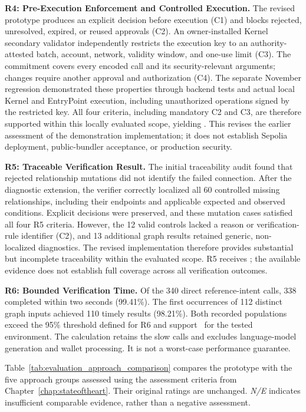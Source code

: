 \noindent\textbf{R4: Pre-Execution Enforcement and Controlled Execution.}
The revised prototype produces an explicit decision before execution (C1)
and blocks rejected, unresolved, expired, or reused approvals (C2).
An owner-installed Kernel secondary validator independently restricts the
execution key to an authority-attested batch, account, network, validity
window, and one-use limit (C3). The commitment covers every encoded call
and its security-relevant arguments; changes require another approval and
authorization (C4). The separate November regression demonstrated these
properties through backend tests and actual local Kernel and EntryPoint
execution, including unauthorized operations signed by the restricted key.
All four criteria, including mandatory C2 and C3, are therefore supported
within this locally evaluated scope, yielding \evThree{}. This revises the
earlier \evOne{} assessment of the demonstration implementation; it does
not establish Sepolia deployment, public-bundler acceptance, or production
security.


\medskip\noindent\textbf{R5: Traceable Verification Result.}
The initial traceability audit found that rejected relationship
mutations did not identify the failed connection. After the diagnostic
extension, the verifier correctly localized all 60 controlled missing
relationships, including their endpoints and applicable expected and
observed conditions. Explicit decisions were preserved, and these
mutation cases satisfied all four R5 criteria. However, the 12 valid
controls lacked a reason or verification-rule identifier (C2), and
13 additional graph results retained generic, non-localized diagnostics.
The revised implementation therefore provides substantial but
incomplete traceability within the evaluated scope. R5 receives \evTwo;
the available evidence does not establish full coverage across all
verification outcomes.



\medskip\noindent\textbf{R6: Bounded Verification Time.}
Of the 340 direct reference-intent calls, 338 completed within two seconds
(99.41\%). The first occurrences of 112 distinct graph inputs achieved
110 timely results (98.21\%). Both recorded populations exceed the 95\%
threshold defined for R6 and support \evThree\ for the tested environment.
The calculation retains the slow calls and excludes language-model generation
and wallet processing. It is not a worst-case performance guarantee.

Table~\ref{tab:evaluation_approach_comparison} compares the prototype with the
five approach groups assessed using the assessment criteria from Chapter~\ref{chap:stateoftheart}. Their original ratings are
unchanged. \textit{N/E} indicates insufficient comparable evidence, rather
than a negative assessment.

